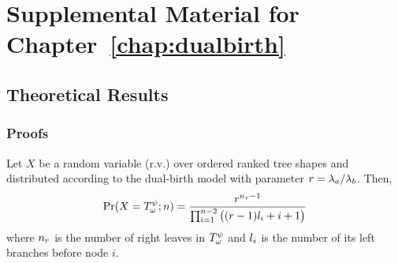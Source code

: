 \chapter{Supplemental Material for Chapter~\ref{chap:dualbirth}}
\label{chap:dualbirth-sup}
\clearpage

\section{Theoretical Results}
\label{sup:theory}\label{sup:sec:app-theory}

\subsection{Proofs}
\label{sec:dualbirth-proofs}

\begin{theorem}\label{sup:thm:TRO}
Let $X$ be a random variable (r.v.) over ordered ranked tree shapes and distributed according to the dual-birth model with parameter $r=\lambda_a/\lambda_b$. Then, 
\begin{equation} %
\Pr(X=\TRO;n) = \frac{r^{\RBh-1}}{\prod_{i=1}^{n-2} \big((r-1)\LB{i}+i+1\big)}
\end{equation}
where $n_r$ is the number of right leaves in $T^\psi_{\omega}$ and $l_{i}$ is the number of its left branches before node $i$.
\end{theorem}

